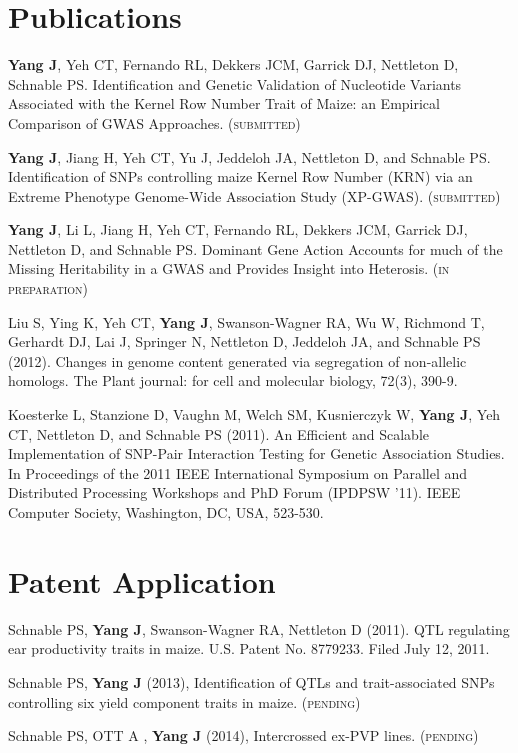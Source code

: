 \documentclass[letterpaper]{article}
\renewenvironment{itemize}{
  \begin{list}{}{
    \setlength{\leftmargin}{1.5em}
  }
}{
  \end{list}
}
\begin{document}
\section*{Publications} 
\begin{itemize}

\item {\bf Yang J}, Yeh CT, Fernando RL, Dekkers JCM, Garrick DJ, Nettleton D, Schnable PS. Identification and Genetic Validation of Nucleotide Variants Associated with the Kernel Row Number Trait of Maize: an Empirical Comparison of GWAS Approaches. (\textsc{submitted})

\item {\bf Yang J}, Jiang H, Yeh CT, Yu J, Jeddeloh JA, Nettleton D, and Schnable PS. Identification of SNPs controlling maize Kernel Row Number (KRN) via an Extreme Phenotype Genome-Wide Association Study (XP-GWAS). (\textsc{submitted})

\item {\bf Yang J}, Li L, Jiang H, Yeh CT, Fernando RL, Dekkers JCM, Garrick DJ, Nettleton D, and Schnable PS. Dominant Gene Action Accounts for much of the Missing Heritability in a GWAS and Provides Insight into Heterosis. (\textsc{in preparation}) 

\item Liu S, Ying K, Yeh CT, {\bf Yang J}, Swanson-Wagner RA, Wu W, Richmond T, Gerhardt DJ, Lai J, Springer N, Nettleton D, Jeddeloh JA, and Schnable PS (2012). Changes in genome content generated via segregation of non-allelic homologs. The Plant journal: for cell and molecular biology, 72(3), 390-9. 

\item Koesterke L, Stanzione D, Vaughn M, Welch SM, Kusnierczyk W, {\bf Yang J}, Yeh CT, Nettleton D, and Schnable PS (2011). An Efficient and Scalable Implementation of SNP-Pair Interaction Testing for Genetic Association Studies. In Proceedings of the 2011 IEEE International Symposium on Parallel and Distributed Processing Workshops and PhD Forum (IPDPSW '11). IEEE Computer Society, Washington, DC, USA, 523-530.

\end{itemize}

\section*{Patent Application}
\begin{itemize}
\item  Schnable PS, {\bf Yang J}, Swanson-Wagner RA, Nettleton D (2011). QTL regulating ear productivity traits in maize. U.S. Patent No. 8779233. Filed July 12, 2011. 

\item Schnable PS, {\bf Yang J} (2013), Identification of QTLs and trait-associated SNPs controlling six yield component traits in maize. (\textsc{pending})
\item Schnable PS, OTT A , {\bf Yang J} (2014), Intercrossed ex-PVP lines. (\textsc{pending})

\end{itemize}
\end{document}
